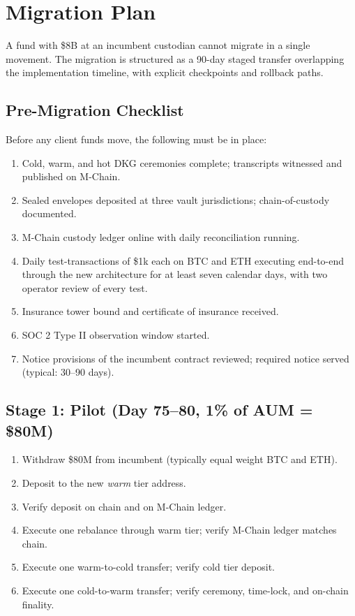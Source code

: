 \section{Migration Plan}

\label{sec:migration}

A fund with \$8B at an incumbent custodian cannot migrate in a single
movement. The migration is structured as a 90-day staged transfer
overlapping the implementation timeline, with explicit checkpoints
and rollback paths.

\subsection{Pre-Migration Checklist}

Before any client funds move, the following must be in place:

\begin{enumerate}[nosep]
\item Cold, warm, and hot DKG ceremonies complete; transcripts
witnessed and published on M-Chain.
\item Sealed envelopes deposited at three vault jurisdictions;
chain-of-custody documented.
\item M-Chain custody ledger online with daily reconciliation
running.
\item Daily test-transactions of \$1k each on BTC and ETH executing
end-to-end through the new architecture for at least seven calendar
days, with two operator review of every test.
\item Insurance tower bound and certificate of insurance received.
\item SOC 2 Type II observation window started.
\item Notice provisions of the incumbent contract reviewed; required
notice served (typical: 30--90 days).
\end{enumerate}

\subsection{Stage 1: Pilot (Day 75--80, 1\% of AUM = \$80M)}

\begin{enumerate}[nosep]
\item Withdraw \$80M from incumbent (typically equal weight BTC and
ETH).
\item Deposit to the new \emph{warm} tier address.
\item Verify deposit on chain and on M-Chain ledger.
\item Execute one rebalance through warm tier; verify M-Chain ledger
matches chain.
\item Execute one warm-to-cold transfer; verify cold tier deposit.
\item Execute one cold-to-warm transfer; verify ceremony, time-lock,
and on-chain finality.
\end{enumerate}

